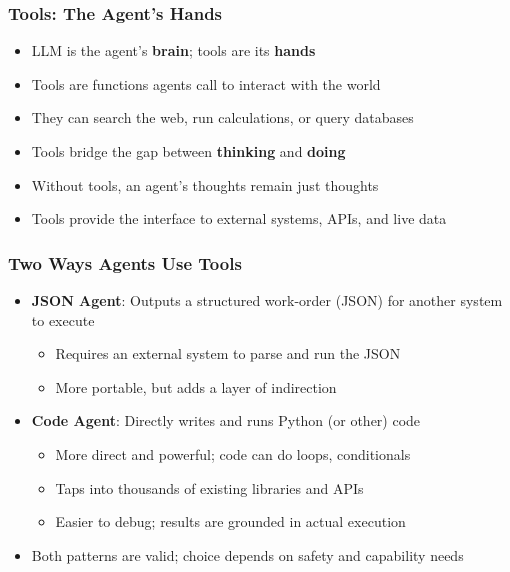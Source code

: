 \begin{frame}[fragile]\frametitle{Tools: The Agent's Hands}
      \begin{itemize}
        \item LLM is the agent's \textbf{brain}; tools are its \textbf{hands}
        \item Tools are functions agents call to interact with the world
        \item They can search the web, run calculations, or query databases
        \item Tools bridge the gap between \textbf{thinking} and \textbf{doing}
        \item Without tools, an agent's thoughts remain just thoughts
        \item Tools provide the interface to external systems, APIs, and live data
      \end{itemize}
\end{frame}

\begin{frame}[fragile]\frametitle{Two Ways Agents Use Tools}
      \begin{itemize}
        \item \textbf{JSON Agent}: Outputs a structured work-order (JSON) for another system to execute
        \begin{itemize}
            \item Requires an external system to parse and run the JSON
            \item More portable, but adds a layer of indirection
        \end{itemize}
        \item \textbf{Code Agent}: Directly writes and runs Python (or other) code
        \begin{itemize}
            \item More direct and powerful; code can do loops, conditionals
            \item Taps into thousands of existing libraries and APIs
            \item Easier to debug; results are grounded in actual execution
        \end{itemize}
        \item Both patterns are valid; choice depends on safety and capability needs
      \end{itemize}
\end{frame}

